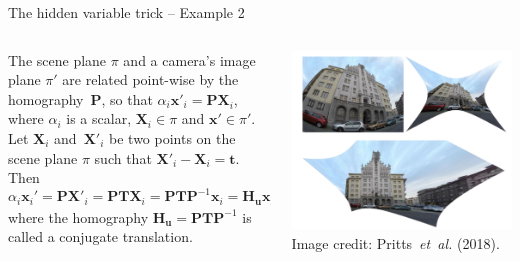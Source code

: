 \documentclass[aspectratio=169]{beamer}
\makeatletter
\newcommand{\etal}{\emph{et~al.}}
\newcommand{\mat}[1]{\bm{#1}}
\DeclareRobustCommand\etal{\emph{et~al}\@ifnextchar.{}{.\@}}
\makeatother
\begin{document}
\def\hiddenvariableTwoeHeight{\vspace{4mm}}
\begin{frame}[t]{The hidden variable trick -- Example 2}
\begin{columns}
    \begin{column}{0.5\textwidth}
        \begin{minipage}[t][\textheight][t]{\textwidth}
        \hiddenvariableTwoeHeight
        The scene plane $\pi$ and a camera's image plane $\pi'$ are related point-wise by the
        homography~$\mat{P}$, so that $\alpha_i\mat{x}'_i=\mat{PX}_i$, where $\alpha_i$ is a scalar,
        $\mat{X}_i\in\pi$ and $\mat{x}'\in\pi'$. Let $\mat{X}_i$ and~$\mat{X}'_i$ be two points on the
        scene plane $\pi$ such that $\mat{X}'_i -\mat{X}_i=\mat{t}$. Then
        \begin{equation*}
            \alpha_i\mat{x}_i' = \mat{PX}'_i = \mat{PTX}_i = \mat{PTP}^{-1}\mat{x}_i=\mat{H_ux}_i,
        \end{equation*}
        where the homography $\mat{H_u}=\mat{PTP}^{-1}$ is called a conjugate translation.
        \end{minipage}
    \end{column}%
    \begin{column}{0.5\textwidth}
        \centering
        \includegraphics[width=\linewidth]{images/conjugate_trans.png}
        {\scriptsize Image credit: Pritts~\etal{} (2018).}
    \end{column}
\end{columns}
\end{frame}
\end{document}
